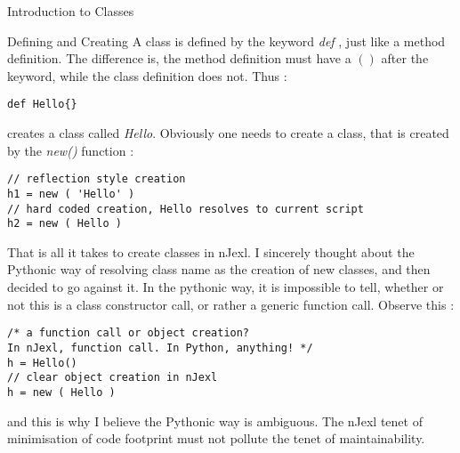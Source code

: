 \begin{section}{Introduction to Classes}

\begin{subsection}{Defining and Creating}
A class is defined by the keyword \emph{def} , just like a method definition.
The difference is, the method definition must have a $()$ after the keyword,
while the class definition does not. Thus :

\begin{center}\begin{minipage}{\linewidth}
\begin{lstlisting}[style=JexlStyle]
def Hello{}
\end{lstlisting}  
\end{minipage}\end{center}

creates a class called \emph{Hello}.
Obviously one needs to create a class, that is created by the \emph{new()} function :

\begin{center}\begin{minipage}{\linewidth}
\begin{lstlisting}[style=JexlStyle]
// reflection style creation 
h1 = new ( 'Hello' )
// hard coded creation, Hello resolves to current script
h2 = new ( Hello ) 
\end{lstlisting}  
\end{minipage}\end{center}
That is all it takes to create classes in nJexl. I sincerely thought about the Pythonic way
of resolving class name as the creation of new classes, and then decided to go against it.
In the pythonic way, it is impossible to tell, whether or not this is a class constructor call, 
or rather a generic function call. Observe this :

\begin{center}\begin{minipage}{\linewidth}
\begin{lstlisting}[style=JexlStyle]
/* a function call or object creation? 
In nJexl, function call. In Python, anything! */
h = Hello() 
// clear object creation in nJexl
h = new ( Hello ) 
\end{lstlisting}  
\end{minipage}\end{center}

and this is why I believe the Pythonic way is ambiguous.
The nJexl tenet of minimisation of code footprint must not pollute the 
tenet of maintainability. 
\end{subsection}


\end{section}
